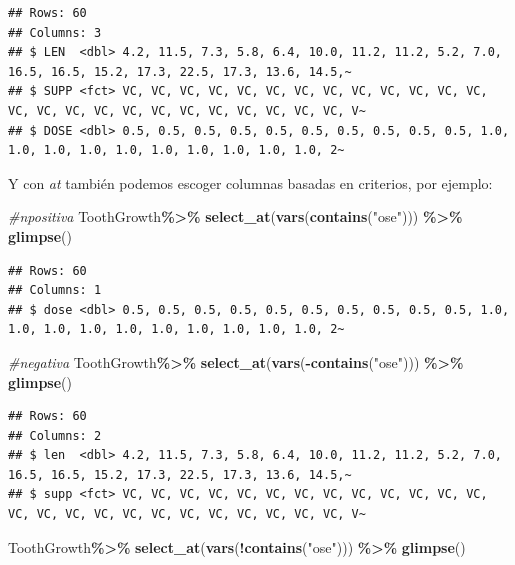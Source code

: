 \documentclass[
]{book}
\newenvironment{Shaded}{\begin{snugshade}}{\end{snugshade}}
\newcommand{\CommentTok}[1]{\textcolor[rgb]{0.56,0.35,0.01}{\textit{#1}}}
\newcommand{\FunctionTok}[1]{\textcolor[rgb]{0.13,0.29,0.53}{\textbf{#1}}}
\newcommand{\NormalTok}[1]{#1}
\newcommand{\SpecialCharTok}[1]{\textcolor[rgb]{0.81,0.36,0.00}{\textbf{#1}}}
\newcommand{\StringTok}[1]{\textcolor[rgb]{0.31,0.60,0.02}{#1}}
\begin{document}
\begin{verbatim}
## Rows: 60
## Columns: 3
## $ LEN  <dbl> 4.2, 11.5, 7.3, 5.8, 6.4, 10.0, 11.2, 11.2, 5.2, 7.0, 16.5, 16.5, 15.2, 17.3, 22.5, 17.3, 13.6, 14.5,~
## $ SUPP <fct> VC, VC, VC, VC, VC, VC, VC, VC, VC, VC, VC, VC, VC, VC, VC, VC, VC, VC, VC, VC, VC, VC, VC, VC, VC, V~
## $ DOSE <dbl> 0.5, 0.5, 0.5, 0.5, 0.5, 0.5, 0.5, 0.5, 0.5, 0.5, 1.0, 1.0, 1.0, 1.0, 1.0, 1.0, 1.0, 1.0, 1.0, 1.0, 2~
\end{verbatim}

\hfill\break
Y con \emph{at} también podemos escoger columnas basadas en criterios, por ejemplo:

\begin{Shaded}
\begin{Highlighting}[]
\CommentTok{\#npositiva}
\NormalTok{ToothGrowth}\SpecialCharTok{\%\textgreater{}\%} \FunctionTok{select\_at}\NormalTok{(}\FunctionTok{vars}\NormalTok{(}\FunctionTok{contains}\NormalTok{(}\StringTok{"ose"}\NormalTok{))) }\SpecialCharTok{\%\textgreater{}\%} \FunctionTok{glimpse}\NormalTok{()}
\end{Highlighting}
\end{Shaded}

\begin{verbatim}
## Rows: 60
## Columns: 1
## $ dose <dbl> 0.5, 0.5, 0.5, 0.5, 0.5, 0.5, 0.5, 0.5, 0.5, 0.5, 1.0, 1.0, 1.0, 1.0, 1.0, 1.0, 1.0, 1.0, 1.0, 1.0, 2~
\end{verbatim}

\begin{Shaded}
\begin{Highlighting}[]
\CommentTok{\#negativa}
\NormalTok{ToothGrowth}\SpecialCharTok{\%\textgreater{}\%} \FunctionTok{select\_at}\NormalTok{(}\FunctionTok{vars}\NormalTok{(}\SpecialCharTok{{-}}\FunctionTok{contains}\NormalTok{(}\StringTok{"ose"}\NormalTok{))) }\SpecialCharTok{\%\textgreater{}\%} \FunctionTok{glimpse}\NormalTok{()}
\end{Highlighting}
\end{Shaded}

\begin{verbatim}
## Rows: 60
## Columns: 2
## $ len  <dbl> 4.2, 11.5, 7.3, 5.8, 6.4, 10.0, 11.2, 11.2, 5.2, 7.0, 16.5, 16.5, 15.2, 17.3, 22.5, 17.3, 13.6, 14.5,~
## $ supp <fct> VC, VC, VC, VC, VC, VC, VC, VC, VC, VC, VC, VC, VC, VC, VC, VC, VC, VC, VC, VC, VC, VC, VC, VC, VC, V~
\end{verbatim}

\begin{Shaded}
\begin{Highlighting}[]
\NormalTok{ToothGrowth}\SpecialCharTok{\%\textgreater{}\%} \FunctionTok{select\_at}\NormalTok{(}\FunctionTok{vars}\NormalTok{(}\SpecialCharTok{!}\FunctionTok{contains}\NormalTok{(}\StringTok{"ose"}\NormalTok{))) }\SpecialCharTok{\%\textgreater{}\%} \FunctionTok{glimpse}\NormalTok{()}
\end{Highlighting}
\end{Shaded}
\end{document}
